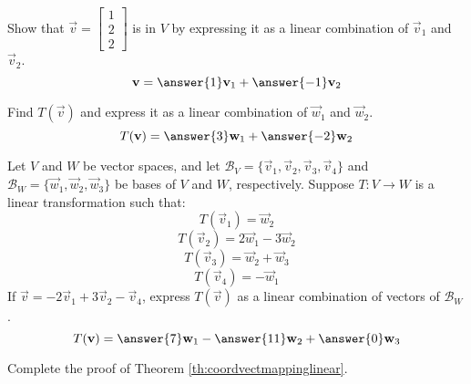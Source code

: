 \documentclass{ximera}
\begin{document}
\begin{problem}
  \begin{problem}\label{prob:lintransandbasis2}
  Show that $\vec{v}=\begin{bmatrix}1\\2\\2\end{bmatrix}$ is in $V$ by expressing it as a linear combination of $\vec{v}_1$ and $\vec{v}_2$.
  $$\vec{v}=\answer{1}\vec{v}_1+\answer{-1}\vec{v}_2$$
  \end{problem}
  
  \begin{problem}\label{prob:lintransandbasis3}
  Find $T(\vec{v})$ and express it as a linear combination of $\vec{w}_1$ and $\vec{w}_2$.
  $$T(\vec{v})=\answer{3}\vec{w}_1+\answer{-2}\vec{w}_2$$
  \end{problem}
  \end{problem}


\begin{problem}\label{prob:lintransandbasis4} Let $V$ and $W$ be vector spaces, and let $\mathcal{B}_V=\{\vec{v}_1, \vec{v}_2, \vec{v}_3, \vec{v}_4\}$ and $\mathcal{B}_W=\{\vec{w}_1,\vec{w}_2, \vec{w}_3\}$ be bases of $V$ and $W$, respectively.  Suppose $T:V\rightarrow W$ is a linear transformation such that: $$T(\vec{v}_1)=\vec{w}_2$$ $$T(\vec{v}_2)=2\vec{w}_1-3\vec{w}_2$$
$$T(\vec{v}_3)=\vec{w}_2+\vec{w}_3$$
$$T(\vec{v}_4)=-\vec{w}_1$$
If $\vec{v}=-2\vec{v}_1+3\vec{v}_2-\vec{v}_4$, express $T(\vec{v})$ as a linear combination of vectors of $\mathcal{B}_W$.
$$T(\vec{v})=\answer{7}\vec{w}_1-\answer{11}\vec{w}_2+\answer{0}\vec{w}_3$$
\end{problem}



\begin{problem}\label{prob:completeproofoflin}
Complete the proof of Theorem \ref{th:coordvectmappinglinear}.
\end{problem}
\end{document}
